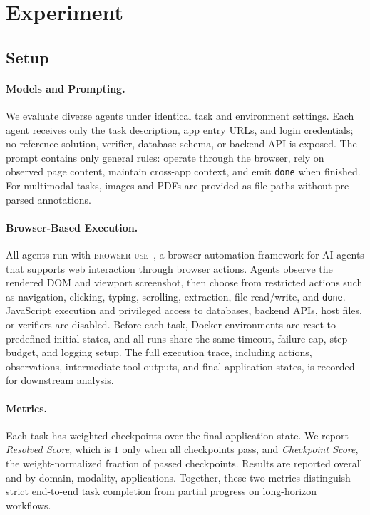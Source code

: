\section{Experiment}
\label{exp}

\subsection{Setup}
\label{exp-setup}

\paragraph{Models and Prompting.}
We evaluate diverse agents under identical task and environment settings. Each agent receives only the task description, app entry URLs, and login credentials; no reference solution, verifier, database schema, or backend API is exposed. The prompt contains only general rules: operate through the browser, rely on observed page content, maintain cross-app context, and emit \texttt{done} when finished. For multimodal tasks, images and PDFs are provided as file paths without pre-parsed annotations.

\paragraph{Browser-Based Execution.}
All agents run with \textsc{browser-use}~\cite{browseruse}, a browser-automation framework for AI agents that supports web interaction through browser actions. Agents observe the rendered DOM and viewport screenshot, then choose from restricted actions such as navigation, clicking, typing, scrolling, extraction, file read/write, and \texttt{done}. JavaScript execution and privileged access to databases, backend APIs, host files, or verifiers are disabled. Before each task, Docker environments are reset to predefined initial states, and all runs share the same timeout, failure cap, step budget, and logging setup. The full execution trace, including actions, observations, intermediate tool outputs, and final application states, is recorded for downstream analysis.

\paragraph{Metrics.}
Each task has weighted checkpoints over the final application state. We report \emph{Resolved Score}, which is $1$ only when all checkpoints pass, and \emph{Checkpoint Score}, the weight-normalized fraction of passed checkpoints. Results are reported overall and by domain, modality, applications. Together, these two metrics distinguish strict end-to-end task completion from partial progress on long-horizon workflows.


